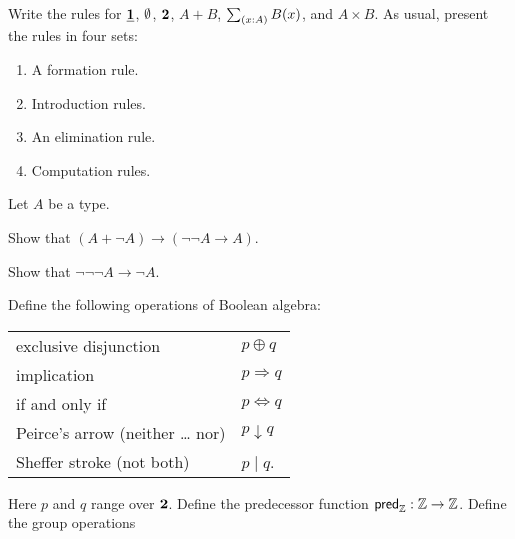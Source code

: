 \begin{exercises}
\exercise
  Write the rules for $\underline{\mathbf{1}}$, $\emptyset$, $\mathbf{2}$, $A+B$, $\sm{x:A}B(x)$, and $A\times B$. As usual, present the rules in four sets:
  \begin{enumerate}
  \item A formation rule.
  \item Introduction rules.
  \item An elimination rule.
  \item Computation rules.
  \end{enumerate}
\exercise Let $A$ be a type.
  \begin{subexenum}
  \item Show that $(A+\neg A)\to(\neg\neg A\to A)$.
  \item Show that $\neg\neg\neg A \to \neg A$.
  \end{subexenum}
\exercise \label{ex:boolean-operation}Define the following operations of Boolean algebra:
  \begin{center}
    \begin{tabular}{ll}
      exclusive disjunction & $p \oplus q$ \\
      implication & $p \Rightarrow q$ \\
      if and only if & $p \Leftrightarrow q$ \\
      Peirce's arrow (neither \dots{} nor) & $p \downarrow q$ \\
      Sheffer stroke (not both) & $p\mid q$.
    \end{tabular}
  \end{center}
  Here $p$ and $q$ range over $\mathbf{2}$. 
\exercise \label{ex:int_pred}Define the predecessor function $\mathsf{pred}_{{\mathbb{Z}}}:{\mathbb{Z}}\to {\mathbb{Z}}$.
\exercise \label{ex:int_group_ops}Define the group operations

\end{exercises}
